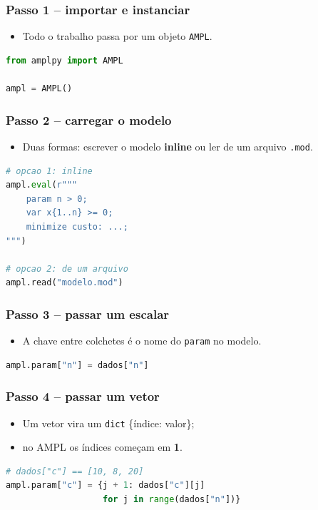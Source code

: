\documentclass[fleqn]{beamer}
\begin{document}
\begin{frame}[fragile]
	\frametitle{Passo 1 -- importar e instanciar}
	\begin{itemize}
		\item Todo o trabalho passa por um objeto \texttt{AMPL}.
	\end{itemize}
	\begin{lstlisting}[language=Python,basicstyle=\ttfamily\small]
from amplpy import AMPL

ampl = AMPL()
	\end{lstlisting}
\end{frame}

\begin{frame}[fragile]
	\frametitle{Passo 2 -- carregar o modelo}
	\begin{itemize}
		\item Duas formas: escrever o modelo \textbf{inline} ou ler de um
			arquivo \texttt{.mod}.
	\end{itemize}
	\begin{lstlisting}[language=Python,basicstyle=\ttfamily\small]
# opcao 1: inline
ampl.eval(r"""
    param n > 0;
    var x{1..n} >= 0;
    minimize custo: ...;
""")

# opcao 2: de um arquivo
ampl.read("modelo.mod")
	\end{lstlisting}
\end{frame}

\begin{frame}[fragile]
	\frametitle{Passo 3 -- passar um escalar}
	\begin{itemize}
		\item A chave entre colchetes é o nome do \texttt{param} no modelo.
	\end{itemize}
	\begin{lstlisting}[language=Python,basicstyle=\ttfamily\small]
ampl.param["n"] = dados["n"]
	\end{lstlisting}
\end{frame}

\begin{frame}[fragile]
	\frametitle{Passo 4 -- passar um vetor}
	\begin{itemize}
		\item Um vetor vira um \texttt{dict} \{índice: valor\};
		\item no AMPL os índices começam em \textbf{1}.
	\end{itemize}
	\begin{lstlisting}[language=Python,basicstyle=\ttfamily\small]
# dados["c"] == [10, 8, 20]
ampl.param["c"] = {j + 1: dados["c"][j]
                   for j in range(dados["n"])}
	\end{lstlisting}
\end{frame}
\end{document}
